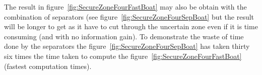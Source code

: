The result in figure~\ref{fig:SecureZoneFourFastBoat} may also be obtain with the combination of separators (see figure~\ref{fig:SecureZoneFourSepBoat} but the result will be longer to get as it have to cut through the uncertain zone even if it is time consuming (and with no information gain). To demonstrate the waste of time done by the separators the figure~\ref{fig:SecureZoneFourSepBoat} has taken thirty six times the time taken to compute the figure~\ref{fig:SecureZoneFourFastBoat} (fastest computation times).